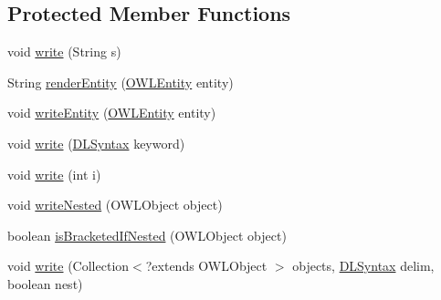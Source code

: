\subsection*{Protected Member Functions}
\begin{DoxyCompactItemize}
\item 
void \hyperlink{classuk_1_1ac_1_1manchester_1_1cs_1_1owlapi_1_1dlsyntax_1_1_d_l_syntax_object_renderer_ad8b565b6aacdefbf5a16bf31429f78e1}{write} (String s)
\item 
String \hyperlink{classuk_1_1ac_1_1manchester_1_1cs_1_1owlapi_1_1dlsyntax_1_1_d_l_syntax_object_renderer_a1912e6d74e313108cb84cfd2fd4becc8}{render\-Entity} (\hyperlink{interfaceorg_1_1semanticweb_1_1owlapi_1_1model_1_1_o_w_l_entity}{O\-W\-L\-Entity} entity)
\item 
void \hyperlink{classuk_1_1ac_1_1manchester_1_1cs_1_1owlapi_1_1dlsyntax_1_1_d_l_syntax_object_renderer_a6b9fb2846333e6fb69f9a6f0ae4aeaff}{write\-Entity} (\hyperlink{interfaceorg_1_1semanticweb_1_1owlapi_1_1model_1_1_o_w_l_entity}{O\-W\-L\-Entity} entity)
\item 
void \hyperlink{classuk_1_1ac_1_1manchester_1_1cs_1_1owlapi_1_1dlsyntax_1_1_d_l_syntax_object_renderer_a3fa6f855d1e7292bc30d90f72ce940e5}{write} (\hyperlink{enumuk_1_1ac_1_1manchester_1_1cs_1_1owlapi_1_1dlsyntax_1_1_d_l_syntax}{D\-L\-Syntax} keyword)
\item 
void \hyperlink{classuk_1_1ac_1_1manchester_1_1cs_1_1owlapi_1_1dlsyntax_1_1_d_l_syntax_object_renderer_a9077a0c8435be9fcd78e8ddbd13f1a2d}{write} (int i)
\item 
void \hyperlink{classuk_1_1ac_1_1manchester_1_1cs_1_1owlapi_1_1dlsyntax_1_1_d_l_syntax_object_renderer_a40cfddb3b7eb287c437690b719250b70}{write\-Nested} (O\-W\-L\-Object object)
\item 
boolean \hyperlink{classuk_1_1ac_1_1manchester_1_1cs_1_1owlapi_1_1dlsyntax_1_1_d_l_syntax_object_renderer_a75f01cba690481acb89e2bfdde8a96f1}{is\-Bracketed\-If\-Nested} (O\-W\-L\-Object object)
\item 
void \hyperlink{classuk_1_1ac_1_1manchester_1_1cs_1_1owlapi_1_1dlsyntax_1_1_d_l_syntax_object_renderer_a50cbee38271e71e6df307b4ded020478}{write} (Collection$<$?extends O\-W\-L\-Object $>$ objects, \hyperlink{enumuk_1_1ac_1_1manchester_1_1cs_1_1owlapi_1_1dlsyntax_1_1_d_l_syntax}{D\-L\-Syntax} delim, boolean nest)
\end{DoxyCompactItemize}
